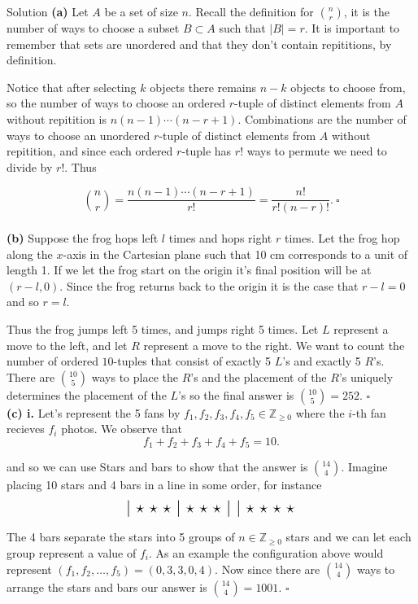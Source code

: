 \documentclass{article}
\begin{document}
\begin{solution}{Solution}
\textbf{(a)} Let $A$ be a set of size $n$. Recall the definition for
$\binom{n}{r}$, it is the number of ways to choose a subset
$B \subset A$ such that $|B| = r$. It is important to remember that
sets are unordered and that they don't contain repititions, by definition.
\vspace{0.2cm}

Notice that after selecting $k$ objects there remains $n-k$ objects to
choose from, so the number of ways to choose an ordered $r$-tuple of
distinct elements from $A$ without repitition is
$n(n-1)\cdots(n-r+1)$. Combinations are the number of ways to choose an
unordered $r$-tuple of distinct elements from $A$
without repitition, and since each ordered $r$-tuple has $r!$ ways to
permute we need to divide by $r!$. Thus

$$
\binom{n}{r} = \frac{n(n-1)\cdots(n-r+1)}{r!} = \frac{n!}{r!(n-r)!}. \
\square
$$
\\
\textbf{(b)} Suppose the frog hops left $l$ times and hops right $r$ times.
Let the frog hop along the $x$-axis in the Cartesian plane such
that 10 cm corresponds to a unit of length 1. If we let the frog start on
the origin it's final position will be at $(r-l,0)$. Since the
frog returns back to the origin it is the case that $r-l=0$ and so $r=l$.
\vspace{0.2cm}

Thus the frog jumps left 5 times, and jumps right 5 times. Let $L$
represent a move to the left, and let $R$ represent a move to the right.
We want to count the number of ordered $10$-tuples that consist of
exactly 5 $L$'s and exactly 5 $R$'s. There are $\binom{10}{5}$ ways to
place the $R$'s and the placement of the $R$'s uniquely determines the
placement of the $L$'s so the final answer is $\binom{10}{5} = 252$.
$\square$\\

\textbf{(c) i.} Let's represent the 5 fans by
$f_1, f_2, f_3, f_4, f_5 \in \mathbb{Z}_{\geq 0}$ where
the $i$-th fan recieves $f_i$ photos. We observe that
$$
f_1 + f_2 + f_3 + f_4 + f_5 = 10.
$$

and so we can use Stars and bars to show that the answer is
$\binom{14}{4}$. Imagine placing 10 stars and 4 bars in a line in some
order, for instance
$$
\text{
\Large
$\mid$
$\star$
$\star$
$\star$
$\mid$
$\star$
$\star$
$\star$
$\mid$
$\mid$
$\star$
$\star$
$\star$
$\star$
}
$$
\normalsize

The 4 bars separate the stars into 5 groups of $n\in \mathbb{Z}_{\geq 0}$
stars and we can let each group
represent a value of $f_i$. As an example the configuration above would
represent $(f_1, f_2, \ldots, f_5)=(0,3,3,0,4)$. Now since there are
$\binom{14}{4}$ ways to arrange the stars and bars our answer is
$\binom{14}{4} = 1001$. $\square$ \\


\end{solution}
\end{document}
